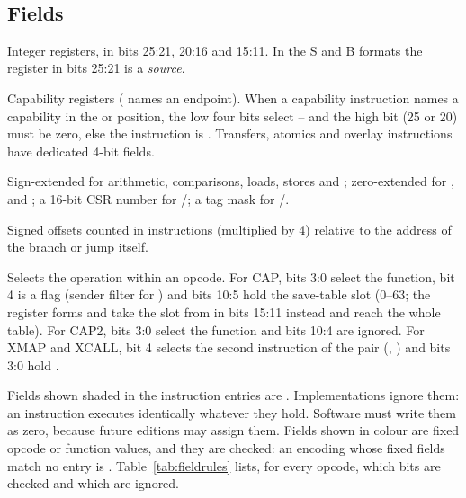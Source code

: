 \begin{encoding}
\\
\end{encoding}

\subsection{Fields}
\begin{description}[leftmargin=1em,style=nextline]
\item[\field{rd}, \field{rs1}, \field{rs2}] Integer registers, in bits 25:21, 20:16 and 15:11. In the S and
  B formats the register in bits 25:21 is a \emph{source}.
\item[\field{cd}, \field{cs}, \field{ce}] Capability registers ( names an endpoint). When a
  capability instruction names a capability in the  or  position, the low four bits
  select -- and the high bit (25 or 20) must be zero, else the instruction is
  . Transfers, atomics and overlay instructions have dedicated 4-bit  fields.
\item[\field{imm16}] Sign-extended for arithmetic, comparisons, loads, stores and ;
  zero-extended for ,  and ; a 16-bit CSR number for /;
  a tag mask for /.
\item[\field{off16}, \field{off21}] Signed offsets counted in instructions (multiplied by 4) relative to
  the address of the branch or jump itself.
\item[\field{funct}] Selects the operation within an opcode. For CAP, bits 3:0 select the function, bit 4
  is a flag (sender filter for ) and bits 10:5 hold the save-table slot (0--63; the
  register forms  and  take the slot from  in bits 15:11 instead and
  reach the whole table). For CAP2, bits 3:0 select the function and bits 10:4 are ignored. For XMAP and XCALL, bit 4 selects the second instruction
  of the pair (, ) and bits 3:0 hold .
\end{description}

Fields shown shaded in the instruction entries are . Implementations ignore them: an
instruction executes identically whatever they hold. Software must write them as zero, because future
editions may assign them. Fields shown in colour are fixed opcode or function values, and they are
checked: an encoding whose fixed fields match no entry is . Table~\ref{tab:fieldrules}
lists, for every opcode, which bits are checked and which are ignored.

